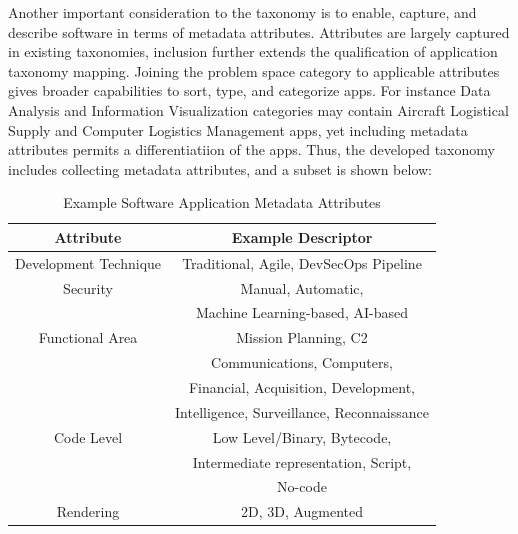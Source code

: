 \documentclass[letterpaper, 10 pt, conference]{ieeeconf}
\begin{document}
 
Another important consideration to the taxonomy is to enable, capture, and describe software in terms of metadata attributes.
Attributes are largely captured in existing taxonomies, inclusion further extends the qualification of application taxonomy mapping.
Joining the problem space category to applicable attributes gives broader capabilities to sort, type, and categorize apps.
For instance Data Analysis and Information Visualization categories may contain Aircraft Logistical Supply and Computer Logistics Management apps, yet including metadata attributes permits a differentiatiion of the apps.
Thus, the developed taxonomy includes collecting metadata attributes, and a subset is shown below:

\begin{table}[h]
\begin{center}
\begin{tabular}{|c||c|}
\hline
\bf Attribute & \bf Example Descriptor\\
\hline
Development Technique & Traditional, Agile, DevSecOps Pipeline\\
\hline
Security & Manual, Automatic, \\
& \newline  Machine Learning-based, AI-based\\
\hline
Functional Area & Mission Planning, C2\\
& \newline Communications, Computers, \\
& \newline Financial, Acquisition, Development, \\
& \newline Intelligence, Surveillance, Reconnaissance\\
\hline
Code Level & Low Level/Binary, Bytecode, \\
& \newline Intermediate representation, Script, \\
& \newline No-code\\
\hline
Rendering & 2D, 3D, Augmented\\
\hline
\end{tabular}
\end{center}
\caption{Example Software Application Metadata Attributes}
\label{}
\end{table}

\end{document}
